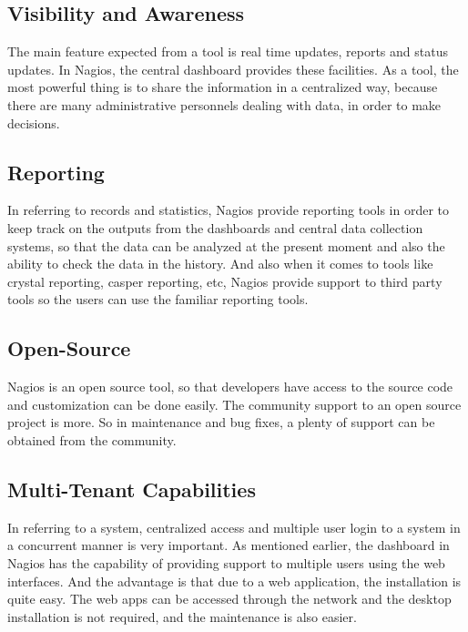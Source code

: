 \documentclass[9pt,twocolumn,twoside]{styles/osajnl}
\begin{document}
\subsection{Visibility and Awareness}

The main feature expected from a tool is real time updates, reports and status updates. In Nagios, the central dashboard provides these facilities. As a tool, the most powerful thing is to share the information in a centralized way, because there are many administrative personnels dealing with data, in order to make decisions. 

\subsection{Reporting}

In referring to records and statistics, Nagios provide reporting tools in order to keep track on the outputs from the dashboards and central data collection systems, so that the data can be analyzed at the present moment and also the ability to check the data in the history. And also when it comes to tools like crystal reporting, casper reporting, etc, Nagios provide support to third party tools so the users can use the familiar reporting tools. 

\subsection{Open-Source}

Nagios is an open source tool, so that developers have access to the source code and customization can be done easily. The community support to an open source project is more. So in maintenance and bug fixes, a plenty of support can be obtained from the community.

\subsection{Multi-Tenant Capabilities}

In referring to a system, centralized access and multiple user login to a system in a concurrent manner is very important. As mentioned earlier, the dashboard in Nagios has the capability of providing support to multiple users using the web interfaces. And the advantage is that due to a web application, the installation is quite easy. The web apps can be accessed through the network and the desktop installation is not required, and the maintenance is also easier.
\end{document}
